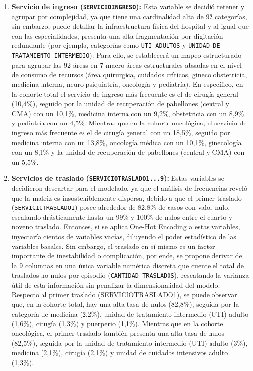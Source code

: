 \begin{enumerate}
    \item \textbf{Servicio de ingreso (\texttt{SERVICIOINGRESO}):} Esta variable se decidió retener y agrupar por complejidad, ya que tiene una cardinalidad alta de 92 categorías, sin embargo, puede detallar la infraestructura física del hospital y al igual que con las especialidades, presenta una alta fragmentación por digitación redundante (por ejemplo, categorías como \texttt{UTI ADULTOS} y \texttt{UNIDAD DE TRATAMIENTO INTERMEDIO}). Para ello, se establecerá un mapeo estructurado para agrupar las 92 áreas en 7 macro áreas estructurales absadas en el nivel de consumo de recursos (área quirurgica, cuidados críticos, gineco obstetricia, medicina interna, neuro psiquiatría, oncología y pediatría). En específico, en la cohorte total el servicio de ingreso más frecuente es el de cirugía general (10,4\%), seguido por la unidad de recuperación de pabellones (central y CMA) con un 10,1\%, medicina interna con un 9,2\%, obstetricia con un 8,9\% y pediatría con un 4,5\%. Mientras que en la cohorte oncológica, el servicio de ingreso más frecuente es el de cirugía general con un 18,5\%, seguido por medicina interna con un 13,8\%, oncología médica con un 10,1\%, ginecología con un 8,1\% y la unidad de recuperación de pabellones (central y CMA) con un 5,5\%.
    \item \textbf{Servicios de traslado (\texttt{SERVICIOTRASLADO1...9}):} Estas variables se decidieron descartar para el modelado, ya que el análisis de frecuencias reveló que la matriz es insosteniblemente dispersa, debido a que el primer traslado (\texttt{SERVICIOTRASLADO1}) posee alrededor de 82,8\% de casos con valor nulo, escalando drásticamente hasta un 99\% y 100\% de nulos entre el cuarto y noveno traslado. Entonces, si se aplica One-Hot Encoding a estas variables, inyectaría cientos de variables vacías, diluyendo el poder estadístico de las variables basales. Sin embargo, el traslado en sí mismo es un factor importante de inestabilidad o complicación, por ende, se propone derivar de la 9 columnas en una única variable numérica discreta que cuente el total de traslados no nulos por episodio (\texttt{CANTIDAD\_TRASLADOS}), rescatando la varianza útil de esta información sin penalizar la dimensionalidad del modelo. Respecto al primer traslado (SERVICIOTRASLADO1), se puede observar que, en la cohorte total, hay una alta tasa de nulos (82,8\%), seguida por la categoría de medicina (2,2\%), unidad de tratamiento intermedio (UTI) adulto (1,6\%), cirugía (1,3\%) y puerperio (1,1\%). Mientras que en la cohorte oncológica, el primer traslado también presenta una alta tasa de nulos (82,5\%), seguida por la unidad de tratamiento intermedio (UTI) adulto (3\%), medicina (2,1\%), cirugía (2,1\%) y unidad de cuidados intensivos adulto (1,3\%).

\end{enumerate}
